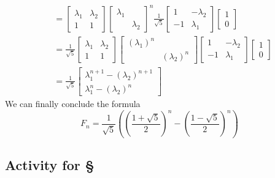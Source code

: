 \documentclass[11pt,oneside]{amsbook}
\theoremstyle{definition}
\theoremstyle{plain}
\theoremstyle{definition}
\theoremstyle{remark}
\numberwithin{equation}{section}
\numberwithin{figure}{section}
\begin{document}
\begin{itemize}
\begin{align*}
    &=\begin{bmatrix}\lambda_1&\lambda_2\\1&1\end{bmatrix}
      \begin{bmatrix}\lambda_1\\&\lambda_2\end{bmatrix}^n
      \frac{1}{\sqrt{5}}
      \begin{bmatrix}1&-\lambda_2\\
        -1&\lambda_1\end{bmatrix}
      \begin{bmatrix}1\\0\end{bmatrix}\\
    &=\frac{1}{\sqrt{5}}
      \begin{bmatrix}\lambda_1&
        \lambda_2\\1&1\end{bmatrix}
      \begin{bmatrix}(\lambda_1)^n\\
        &(\lambda_2)^n\end{bmatrix}
      \begin{bmatrix}1&-\lambda_2\\
        -1&\lambda_1\end{bmatrix}
      \begin{bmatrix}1\\0\end{bmatrix}\\
    &=\frac{1}{\sqrt{5}}
      \begin{bmatrix}
        \lambda_1^{n+1}-(\lambda_2)^{n+1}\\
        \lambda_1^n-(\lambda_2)^n
      \end{bmatrix}
  \end{align*}
  We can finally conclude the formula
  \[F_n=\frac{1}{\sqrt{5}}
    \left(\left(\frac{1+\sqrt{5}}{2}\right)^n
    -\left(\frac{1-\sqrt{5}}{2}\right)^n\right)
  \]
\end{itemize}

\newpage
\subsection*{Activity for \S \thesection}
\end{document}
